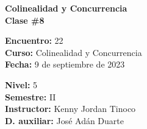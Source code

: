 \begin{center} \textbf
{
    \Large Colinealidad y Concurrencia \\ \vspace{2mm}Clase \#8
}
\end{center}

\begin{multicols}{2}
{
    \textbf{Encuentro:} 22\\
    \textbf{Curso:} Colinealidad y Concurrencia\\
    \textbf{Fecha:} 9 de septiembre de 2023\\
    \begin{flushright}
        \textbf{Nivel:} 5\\
        \textbf{Semestre:} II\\
        \textbf{Instructor:} Kenny Jordan Tinoco\\
        \textbf{D. auxiliar: }José Adán Duarte
    \end{flushright}
}
\end{multicols}

\thispagestyle{first-page-style}